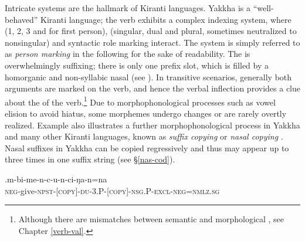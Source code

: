 Intricate  systems are the hallmark of Kiranti languages. Yakkha is a “well-behaved” Kiranti language; the verb exhibits a complex indexing system, where (1, 2, 3 and  for first person), (singular, dual and plural, sometimes neutralized to nonsingular) and syntactic role marking interact. The system is simply referred to as \emph{person marking} in the following for the sake of readability. The   is overwhelmingly suffixing; there is only one prefix slot, which is filled by a homorganic  and non-syllabic nasal (see \Next). In transitive scenarios, generally both arguments are marked on the verb, and hence the verbal inflection provides a clue about the  of the verb.\footnote{Although there are mismatches between semantic and morphological , see Chapter \ref{verb-val}.} Due to morphophonological processes such as vowel elision to avoid hiatus, some morphemes undergo changes or are rarely overtly realized. Example \Next also illustrates a further morphophonological process in Yakkha and many other Kiranti languages, known as \emph{suffix copying} or \emph{nasal copying} \citep{Bickel2003Belhare, Doornenbal2009A-grammar, Ebert2003Kiranti, Schikowski2012_Morphology}. Nasal suffixes in Yakkha  can be copied regressively and thus may appear up to three times in one suffix string (see §\ref{nas-cod}).


\exg.m-bi-me-n-c-u-n-ci-ŋa-n=na\\
{\scshape neg-}give{\scshape -npst-[copy]-du-3.P-[copy]-nsg.P-excl-neg=nmlz.sg}\\


